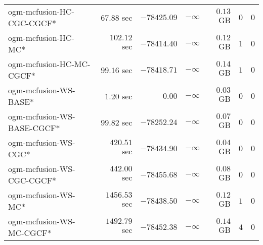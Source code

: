 \begin{table}[H]
\begin{tabular}{lrrrrrr}
ogm-mcfusion-HC-CGC-CGCF* & $        67.88$ sec & $    -78425.09$ & $-\infty$ & $         0.13$ GB & $       0$ & $       0$ \\ 
 ogm-mcfusion-HC-MC* & $       102.12$ sec & $    -78414.40$ & $-\infty$ & $         0.12$ GB & $       1$ & $       0$ \\ 
ogm-mcfusion-HC-MC-CGCF* & $        99.16$ sec & $    -78418.71$ & $-\infty$ & $         0.14$ GB & $       1$ & $       0$ \\ 
ogm-mcfusion-WS-BASE* & $         1.20$ sec & $         0.00$ & $-\infty$ & $         0.03$ GB & $       0$ & $       0$ \\ 
ogm-mcfusion-WS-BASE-CGCF* & $        99.82$ sec & $    -78252.24$ & $-\infty$ & $         0.07$ GB & $       0$ & $       0$ \\ 
ogm-mcfusion-WS-CGC* & $       420.51$ sec & $    -78434.90$ & $-\infty$ & $         0.04$ GB & $       0$ & $       0$ \\ 
ogm-mcfusion-WS-CGC-CGCF* & $       442.00$ sec & $    -78455.68$ & $-\infty$ & $         0.08$ GB & $       0$ & $       0$ \\ 
 ogm-mcfusion-WS-MC* & $      1456.53$ sec & $    -78438.50$ & $-\infty$ & $         0.12$ GB & $       1$ & $       0$ \\ 
ogm-mcfusion-WS-MC-CGCF* & $      1492.79$ sec & $    -78452.38$ & $-\infty$ & $         0.14$ GB & $       4$ & $       0$ \\ 
\bottomrule
\end{tabular}
\end{table}